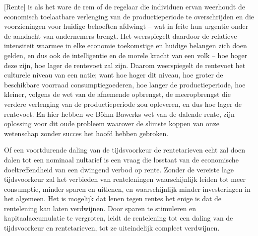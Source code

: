 \begin{blockquotebox}
    {[}Rente{]} is als het ware de rem of de regelaar die individuen ervan weerhoudt de economisch toelaatbare verlenging van de productieperiode te overschrijden en die voorzieningen voor huidige behoeften afdwingt -- wat in feite hun urgentie onder de aandacht van ondernemers brengt. Het weerspiegelt daardoor de relatieve intensiteit waarmee in elke economie toekomstige en huidige belangen zich doen gelden, en dus ook de intelligentie en de morele kracht van een volk -- hoe hoger deze zijn, hoe lager de rentevoet zal zijn. Daarom weerspiegelt de rentevoet het culturele niveau van een natie; want hoe hoger dit niveau, hoe groter de beschikbare voorraad consumptiegoederen, hoe langer de productieperiode, hoe kleiner, volgens de wet van de afnemende opbrengst, de meeropbrengst die verdere verlenging van de productieperiode zou opleveren, en dus hoe lager de rentevoet. En hier hebben we Böhm-Bawerk\textquotesingle s wet van de dalende rente, zijn oplossing voor dit oude probleem waarover de slimste koppen van onze wetenschap zonder succes het hoofd hebben gebroken.\footnotemark
\end{blockquotebox}

Of een voortdurende daling van de tijdsvoorkeur de rentetarieven echt zal doen dalen tot een nominaal nultarief is een vraag die losstaat van de economische doeltreffendheid van een dwingend verbod op rente. Zonder de vereiste lage tijdsvoorkeur zal het verbieden van renteleningen waarschijnlijk leiden tot meer consumptie, minder sparen en uitlenen, en waarschijnlijk minder investeringen in het algemeen. Het is mogelijk dat lenen tegen rentes het enige is dat de rentelening kan laten verdwijnen. Door sparen te stimuleren en kapitaalaccumulatie te vergroten, leidt de rentelening tot een daling van de tijdsvoorkeur en rentetarieven, tot ze uiteindelijk compleet verdwijnen.

